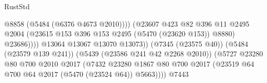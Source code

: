 \begin{lexlean}{RustStd}
\begin{coremodule}
{\begin{coremodule}
{{{{{{{{{{{{{{{{{{{{{{{{{{{{{{{                                                          @8858
                                                          (@5484 (@6376 @4673 @2010))))
                                                      (@23607
                                                        @423
                                                        @82
                                                        @396
                                                        @11
                                                        @2495
                                                        @2004
                                                        (@23615
                                                          @153
                                                          @396
                                                          @153
                                                          @2495
                                                          (@5470 (@23620 @153))
                                                          @8880)
                                                        @23686))))
                                                @13064
                                                @13067
                                                @13070
                                                @13073))
                                            (@7345 (@23575 @40))
                                            (@5484 (@23579 @139 @241))
                                            (@5439 (@23586 @241 @42 @2268 @2010))
                                            (@5727
                                              @23280
                                              @80
                                              @700
                                              @2010
                                              @2017
                                              (@7432
                                                @23280
                                                @1867
                                                @80
                                                @700
                                                @2017
                                                (@23519
                                                  @64
                                                  @700
                                                  @64
                                                  @2017
                                                  (@5470 (@23524 @64))
                                                  @5663))))
                                          @7443
}}}}}}}}}}}}}}}}}}}}}}}}}}}}}}}
\end{coremodule}}
\end{coremodule}
\end{lexlean}
